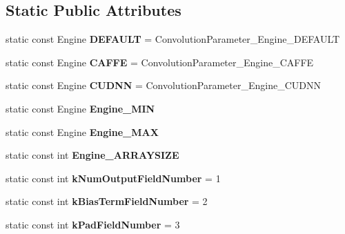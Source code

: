 \subsection*{Static Public Attributes}
\begin{DoxyCompactItemize}
\item 
\mbox{\label{classcaffe_1_1_convolution_parameter_ad8af8d7accea68db11e8c4603de99436}} 
static const Engine {\bfseries D\+E\+F\+A\+U\+LT} = Convolution\+Parameter\+\_\+\+Engine\+\_\+\+D\+E\+F\+A\+U\+LT
\item 
\mbox{\label{classcaffe_1_1_convolution_parameter_ab93b97f8c52b3bf92aeddb04b7511649}} 
static const Engine {\bfseries C\+A\+F\+FE} = Convolution\+Parameter\+\_\+\+Engine\+\_\+\+C\+A\+F\+FE
\item 
\mbox{\label{classcaffe_1_1_convolution_parameter_a6c650e132871217743ea8d1e72efadaa}} 
static const Engine {\bfseries C\+U\+D\+NN} = Convolution\+Parameter\+\_\+\+Engine\+\_\+\+C\+U\+D\+NN
\item 
static const Engine {\bfseries Engine\+\_\+\+M\+IN}
\item 
static const Engine {\bfseries Engine\+\_\+\+M\+AX}
\item 
static const int {\bfseries Engine\+\_\+\+A\+R\+R\+A\+Y\+S\+I\+ZE}
\item 
\mbox{\label{classcaffe_1_1_convolution_parameter_a50c88187b8da2e8d4d0f3f8c1d04922f}} 
static const int {\bfseries k\+Num\+Output\+Field\+Number} = 1
\item 
\mbox{\label{classcaffe_1_1_convolution_parameter_a86e476fb348974b2dcbb3fbcda84effa}} 
static const int {\bfseries k\+Bias\+Term\+Field\+Number} = 2
\item 
\mbox{\label{classcaffe_1_1_convolution_parameter_aff350ee2a9ced029884fb7be7f92f21f}} 
static const int {\bfseries k\+Pad\+Field\+Number} = 3
\item 
\mbox{\label{classcaffe_1_1_convolution_parameter_a18250a431700ce6336c92acd122d086c}} 

\end{DoxyCompactItemize}
